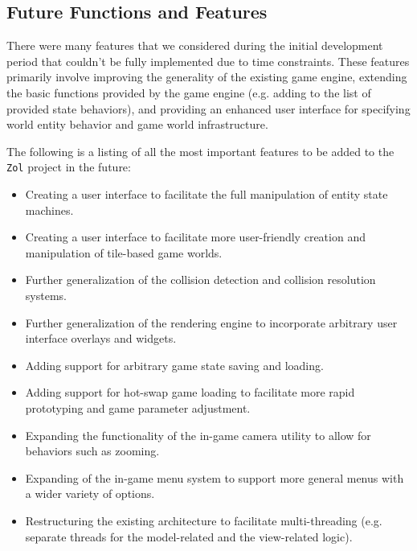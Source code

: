 \documentclass{article}
\newcommand{\projectname}[0] {\texttt{Zol} }
\begin{document}
		\subsection[Features]{Future Functions and Features}
		There were many features that we considered during the initial development 
		period that couldn't be fully implemented due to time constraints.  These
		features primarily involve improving the generality of the existing game
		engine, extending the basic functions provided by the game engine (e.g.
		adding to the list of provided state behaviors), and providing an enhanced
		user interface for specifying world entity behavior and game world 
		infrastructure.

		The following is a listing of all the most important features to be added
		to the \projectname project in the future:

		\begin{itemize}
			\item Creating a user interface to facilitate the full manipulation 
			of entity state machines.

			\item Creating a user interface to facilitate more user-friendly
			creation and manipulation of tile-based game worlds.

			\item Further generalization of the collision detection and collision
			resolution systems.

			\item Further generalization of the rendering engine to incorporate
			arbitrary user interface overlays and widgets.

			\item Adding support for arbitrary game state saving and loading.

			\item Adding support for hot-swap game loading to facilitate more
			rapid prototyping and game parameter adjustment.

			\item Expanding the functionality of the in-game camera utility to
			allow for behaviors such as zooming.

			\item Expanding of the in-game menu system to support more general
			menus with a wider variety of options.

			\item Restructuring the existing architecture to facilitate
			multi-threading (e.g. separate threads for the model-related and
			the view-related logic).
		\end{itemize}
\end{document}
